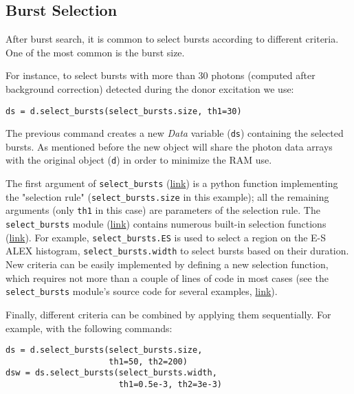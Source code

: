 \subsection{Burst Selection}
\label{sec:burstsel}

After burst search, it is common to select bursts according to different
criteria. One of the most common is the burst size.

For instance, to select bursts with more than 30 photons (computed
after background correction) detected during the donor excitation
we use:

\begin{lstlisting}
ds = d.select_bursts(select_bursts.size, th1=30)
\end{lstlisting}

The previous command creates a new \textit{Data} variable (\verb|ds|) containing
the selected bursts.
As mentioned before the new object will share the photon data
arrays with the original object (\verb|d|) in order to minimize the RAM use.

The first argument of \verb|select_bursts| 
(\href{http://fretbursts.readthedocs.org/en/latest/data_class.html#burst-selection-methods}{link})
is a python function implementing the "selection rule" (\verb|select_bursts.size| in this example);
all the remaining arguments (only \verb|th1| in this case) are parameters of the selection rule.
The \verb|select_bursts| module 
(\href{http://fretbursts.readthedocs.org/en/latest/burst_selection.html}{link})
contains numerous built-in selection functions
(\href{http://fretbursts.readthedocs.org/en/latest/burst_selection.html#module-fretbursts.select_bursts}{link}).
For example,
\verb|select_bursts.ES|
is used to select a region on the E-S ALEX histogram,
\verb|select_bursts.width|
to select bursts based on their duration.
New criteria can be easily implemented by defining a new selection function,
which requires not more than a couple of lines of code in most cases (see the
\verb|select_bursts| module's source code
for several examples, 
\href{https://github.com/tritemio/FRETBursts/blob/master/fretbursts/select_bursts.py}{link}).

Finally, different criteria can be combined by applying them sequentially.
For example, with the following commands:

\begin{lstlisting}
ds = d.select_bursts(select_bursts.size,
                     th1=50, th2=200)
dsw = ds.select_bursts(select_bursts.width,
                       th1=0.5e-3, th2=3e-3)
\end{lstlisting}

